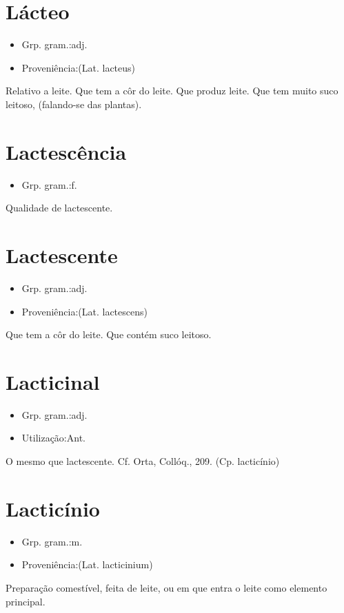 \section{Lácteo}
\begin{itemize}
\item {Grp. gram.:adj.}
\end{itemize}
\begin{itemize}
\item {Proveniência:(Lat. \textunderscore lacteus\textunderscore )}
\end{itemize}
Relativo a leite.
Que tem a côr do leite.
Que produz leite.
Que tem muito suco leitoso, (falando-se das plantas).
\section{Lactescência}
\begin{itemize}
\item {Grp. gram.:f.}
\end{itemize}
Qualidade de lactescente.
\section{Lactescente}
\begin{itemize}
\item {Grp. gram.:adj.}
\end{itemize}
\begin{itemize}
\item {Proveniência:(Lat. \textunderscore lactescens\textunderscore )}
\end{itemize}
Que tem a côr do leite.
Que contém suco leitoso.
\section{Lacticinal}
\begin{itemize}
\item {Grp. gram.:adj.}
\end{itemize}
\begin{itemize}
\item {Utilização:Ant.}
\end{itemize}
O mesmo que \textunderscore lactescente\textunderscore . Cf. Orta, \textunderscore Collóq.\textunderscore , 209.
(Cp. \textunderscore lacticínio\textunderscore )
\section{Lacticínio}
\begin{itemize}
\item {Grp. gram.:m.}
\end{itemize}
\begin{itemize}
\item {Proveniência:(Lat. \textunderscore lacticinium\textunderscore )}
\end{itemize}
Preparação comestível, feita de leite, ou em que entra o leite como elemento principal.
